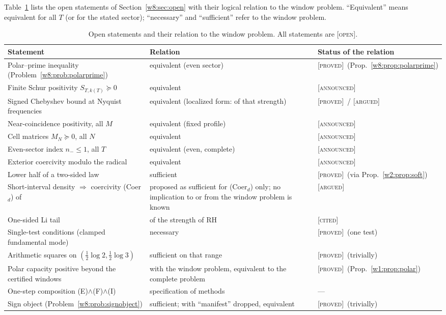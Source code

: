 \documentclass[11pt]{amsart}
\theoremstyle{definition}
\theoremstyle{remark}
\numberwithin{equation}{section}
\newcommand{\stag}[1]{\textsc{[#1]}}
\newcommand{\PROVED}{\stag{proved}}
\newcommand{\CITED}{\stag{cited}}
\newcommand{\ARGUED}{\stag{argued}}
\newcommand{\OPENQ}{\stag{open}}
\newcommand{\ANNOUNCED}{\stag{announced}}
\begin{document}
Table~\ref{w8:tab:openstatements} lists the open statements of Section~\ref{w8:sec:open} with their logical relation
to the window problem. ``Equivalent'' means equivalent for all $T$ (or for the stated sector); ``necessary'' and
``sufficient'' refer to the window problem.

\begin{table}[htbp]\centering\small
\begin{tabular}{p{6.6cm}p{3.4cm}p{3cm}}
\toprule
Statement & Relation & Status of the relation\\\midrule
Polar--prime inequality (Problem~\ref{w8:prob:polarprime}) & equivalent (even sector) & \PROVED\ (Prop.~\ref{w8:prop:polarprime})\\
Finite Schur positivity $S_{T,k(T)}\succeq0$ & equivalent & \ANNOUNCED\\
Signed Chebyshev bound at Nyquist frequencies & equivalent (localized form: of that strength) & \PROVED\ / \ARGUED\\
Near-coincidence positivity, all $M$ & equivalent (fixed profile) & \ANNOUNCED\\
Cell matrices $M_N\succeq0$, all $N$ & equivalent & \ANNOUNCED\\
Even-sector index $n_-\le1$, all $T$ & equivalent (even, complete) & \ANNOUNCED\\
Exterior coercivity modulo the radical & equivalent & \ANNOUNCED\\
Lower half of a two-sided law & sufficient & \PROVED\ (via Prop.~\ref{w2:prop:soft})\\
Short-interval density $\Rightarrow$ coercivity (Coer$_d$) of \cite{P08} & proposed as sufficient for (Coer$_d$) only; no implication to or from the window problem is known & \ARGUED\\
One-sided Li tail & of the strength of RH & \CITED\ \cite{Li1997}\\
Single-test conditions (clamped fundamental mode) & necessary & \PROVED\ (one test)\\
Arithmetic squares on $(\frac12\log2,\frac12\log3)$ & sufficient on that range & \PROVED\ (trivially)\\
Polar capacity positive beyond the certified windows & with the window problem, equivalent to the complete problem & \PROVED\ (Prop.~\ref{w1:prop:polar})\\
One-step composition (E)$\wedge$(F)$\wedge$(I) & specification of methods & ---\\
Sign object (Problem~\ref{w8:prob:signobject}) & sufficient; with ``manifest'' dropped, equivalent & \PROVED\ (trivially)\\
\bottomrule
\end{tabular}
\caption{Open statements and their relation to the window problem. All statements are \OPENQ.}\label{w8:tab:openstatements}
\end{table}
\end{document}
